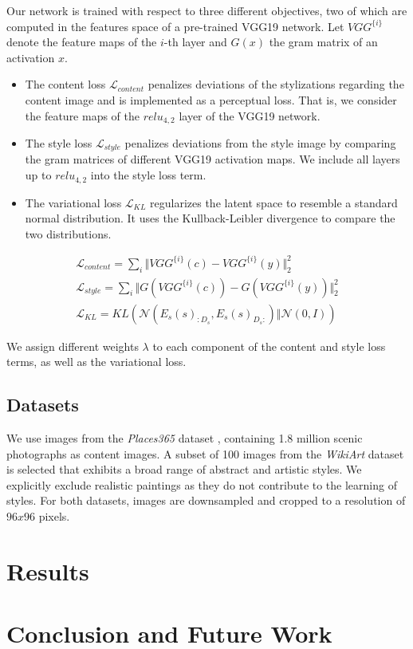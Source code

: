 \documentclass[10pt,twocolumn,letterpaper]{article}
\begin{document}
Our network is trained with respect to three different objectives, two of which are computed in the features space of a pre-trained VGG19 network. Let $VGG^{\{i\}}$ denote the feature maps of the $i$-th layer and $G(x)$ the gram matrix of an activation $x$.
\begin{itemize}
	\item The content loss $\mathcal{L}_{content}$ penalizes deviations of the stylizations regarding the content image and is implemented as a perceptual loss. That is, we consider the feature maps of the $relu_{4,2}$ layer of the VGG19 network.
	\item The style loss $\mathcal{L}_{style}$ penalizes deviations from the style image by comparing the gram matrices of different VGG19 activation maps. We include all layers up to $relu_{4,2}$ into the style loss term.
	\item The variational loss $\mathcal{L}_{KL}$ regularizes the latent space to resemble a standard normal distribution. It uses the Kullback-Leibler divergence to compare the two distributions.
\end{itemize}
\begin{multline}
\mathcal{L}_{content} = \sum_{i} \Vert VGG^{\{i\}}(c) - VGG^{\{i\}}(y)\Vert_2^2 \\
\mathcal{L}_{style} = \sum_{i} \Vert G(VGG^{\{i\}}(c)) - G(VGG^{\{i\}}(y))\Vert_2^2 \\
\mathcal{L}_{KL} = KL(\mathcal{N}(E_s(s)_{:D_s}, E_s(s)_{D_s:}) \Vert \mathcal{N}(0, I))
\end{multline}

We assign different weights $\lambda$ to each component of the content and style loss terms, as well as the variational loss.

\subsection{Datasets}

We use images from the \textit{Places365} dataset \cite{places365}, containing 1.8 million scenic photographs as content images. A subset of 100 images from the \textit{WikiArt} dataset is selected that exhibits a broad range of abstract and artistic styles. We explicitly exclude realistic paintings as they do not contribute to the learning of styles. For both datasets, images are downsampled and cropped to a resolution of $96x96$ pixels.

\section{Results}

\section{Conclusion and Future Work}

{\small


}
\end{document}
